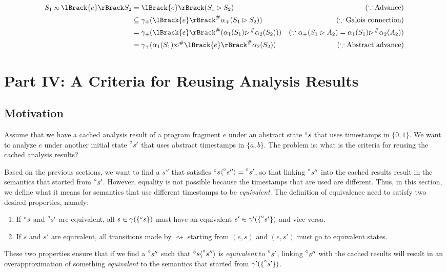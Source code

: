 \documentclass{article}
\theoremstyle{definition}
\newcommand*{\A}[1]{\prescript{\circ}{}{#1}}
\newcommand*{\Abs}[1]{{#1}^{\#}}
\newcommand*{\semarrow}{\rightsquigarrow}
\newcommand*{\semlink}{\mathbin{\rotatebox[origin=c]{180}{$\propto$}}}
\newcommand*{\sembracket}[1]{\lBrack{#1}\rBrack}
\newcommand*{\inject}[2]{{#2}\langle{#1}\rangle}
\begin{document}
\begin{align*}
  S_1\semlink\sembracket{e}S_2 & =\sembracket{e}(S_1\rhd S_2)                                          & (\because\text{Advance})                                           \\
                               & \subseteq\gamma_+(\Abs{\sembracket{e}}\alpha_+(S_1\rhd S_2))          & (\because\text{Galois connection})                                 \\
                               & =\gamma_+(\Abs{\sembracket{e}}(\alpha_1(S_1)\Abs\rhd\alpha_2(S_2)))   & (\because\alpha_+(S_1\rhd A_2)=\alpha_1(S_1)\Abs\rhd\alpha_2(A_2)) \\
                               & =\gamma_+(\alpha_1(S_1)\Abs\semlink\Abs{\sembracket{e}}\alpha_2(S_2)) & (\because\text{Abstract advance})
\end{align*}
\section{Part IV: A Criteria for Reusing Analysis Results}
\subsection{Motivation}
Assume that we have a cached analysis result of a program fragment $e$ under an abstract state $\A{s}$ that uses timestamps in $\{0,1\}$.
We want to analyze $e$ under another initial state $\A{s'}$ that uses abstract timestamps in $\{a,b\}$.
The problem is: what is the criteria for reusing the cached analysis results?

Based on the previous sections, we want to find a $s''$ that satisfies $\inject{\A{s''}}{\A{s}}=\A{s'}$, so that linking $\A{s''}$ into the cached results result in the semantics that started from $\A{s'}$.
However, equality is not possible because the timestamps that are used are different.
Thus, in this section, we define what it means for semantics that use different timestamps to be \emph{equivalent}.
The definition of equivalence need to satisfy two desired properties, namely:
\begin{enumerate}
  \item If $\A{s}$ and $\A{s'}$ are equivalent, all $s\in\gamma(\{\A{s}\})$ must have an equivalent $s'\in\gamma'(\{\A{s'}\})$ and vice versa.
  \item If $s$ and $s'$ are equivalent, all transitions made by $\semarrow$ starting from $(e,s)$ and $(e,s')$ must go to equivalent states.
\end{enumerate}
These two properties ensure that if we find a $\A{s''}$ such that $\inject{\A{s''}}{\A{s}}$ is \emph{equivalent} to $\A{s'}$, linking $\A{s''}$ with the cached results will result in an overapproximation of something \emph{equivalent} to the semantics that started from $\gamma'(\{\A{s'}\})$.
\end{document}
